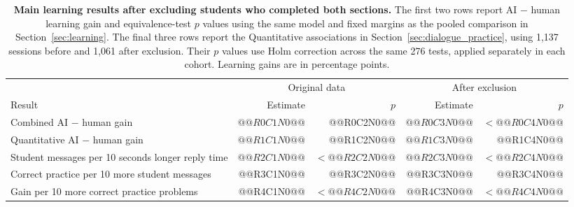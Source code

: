 \begin{table}[H]
\centering
\caption{\textbf{Main learning results after excluding students who completed both sections.} The first two rows report AI $-$ human learning gain and equivalence-test $p$ values using the same model and fixed margins as the pooled comparison in Section~\ref{sec:learning}. The final three rows report the Quantitative associations in Section~\ref{sec:dialogue_practice}, using 1,137 sessions before and 1,061 after exclusion. Their $p$ values use Holm correction across the same 276 tests, applied separately in each cohort. Learning gains are in percentage points.}
\label{tab:repeat_participation}
\begin{tabular}{p{.42\linewidth}rrrr}
\toprule
& \multicolumn{2}{c}{Original data} & \multicolumn{2}{c}{After exclusion}\\
\cmidrule(lr){2-3}\cmidrule(lr){4-5}
Result & Estimate & $p$ & Estimate & $p$\\
\midrule
Combined AI $-$ human gain & $@@R0C1N0@@$ & @@R0C2N0@@ & $@@R0C3N0@@$ & $<@@R0C4N0@@$\\
Quantitative AI $-$ human gain & $@@R1C1N0@@$ & @@R1C2N0@@ & $@@R1C3N0@@$ & @@R1C4N0@@\\
Student messages per 10 seconds longer reply time & $@@R2C1N0@@$ & $<@@R2C2N0@@$ & $@@R2C3N0@@$ & $<@@R2C4N0@@$\\
Correct practice per 10 more student messages & @@R3C1N0@@ & @@R3C2N0@@ & @@R3C3N0@@ & @@R3C4N0@@\\
Gain per 10 more correct practice problems & @@R4C1N0@@ & $<@@R4C2N0@@$ & @@R4C3N0@@ & $<@@R4C4N0@@$\\
\bottomrule
\end{tabular}
\end{table}